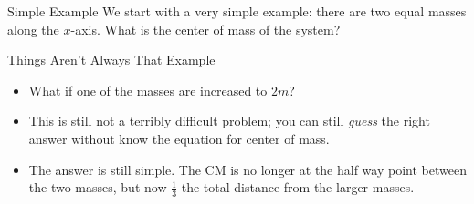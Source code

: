 \documentclass[12pt,compress,aspectratio=169]{beamer}
\begin{document}
\begin{frame}{Simple Example}
  We start with a very simple example: there are two equal masses along the
  $x$-axis. What is the center of mass of the system?
    
  \vspace{.25in}
  \begin{center}
  \end{center}
  \vspace{.2in}

\end{frame}

 
\begin{frame}{Things Aren't Always That Example}
  \begin{itemize}
  \item What if one of the masses are increased to $2m$?
  \item This is still not a terribly difficult problem; you can still
    \emph{guess} the right answer without know the equation for center of mass.
    
    \vspace{.25in}
    \begin{center}
    \end{center}
    \vspace{.15in}

  \item<2-> The answer is still simple. The CM is no longer at the half way
    point between the two masses, but now $\frac{1}{3}$ the total distance from
    the larger masses.
  \end{itemize}
\end{frame}
\end{document}
